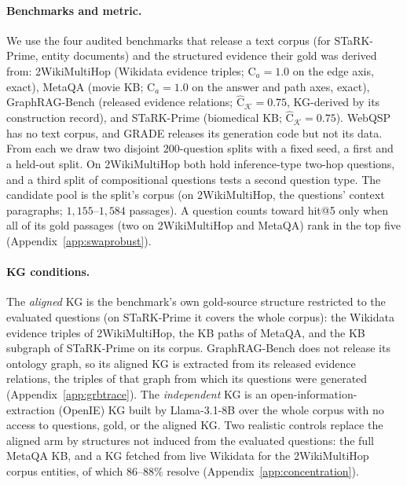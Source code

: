 \documentclass[11pt]{article}
\newcommand{\C}{\mathrm{C}}
\newcommand{\Chat}{\widehat{\mathrm{C}}}
\newcommand{\kg}{\mathcal{K}}
\begin{document}
\paragraph{Benchmarks and metric.} We use the four audited benchmarks that release a text corpus (for STaRK-Prime, entity documents) and the structured evidence their gold was derived from: 2WikiMultiHop (Wikidata evidence triples; $\C_a=1.0$ on the edge axis, exact), MetaQA (movie KB; $\C_a=1.0$ on the answer and path axes, exact), GraphRAG-Bench (released evidence relations; $\Chat_{\kg}=0.75$, KG-derived by its construction record), and STaRK-Prime (biomedical KB; $\Chat_{\kg}=0.75$). WebQSP has no text corpus, and GRADE releases its generation code but not its data. From each we draw two disjoint $200$-question splits with a fixed seed, a first and a held-out split. On 2WikiMultiHop both hold inference-type two-hop questions, and a third split of compositional questions tests a second question type. The candidate pool is the split's corpus (on 2WikiMultiHop, the questions' context paragraphs; $1{,}155$--$1{,}584$ passages). A question counts toward hit@5 only when all of its gold passages (two on 2WikiMultiHop and MetaQA) rank in the top five (Appendix~\ref{app:swaprobust}).

\paragraph{KG conditions.} The \emph{aligned} KG is the benchmark's own gold-source structure restricted to the evaluated questions (on STaRK-Prime it covers the whole corpus): the Wikidata evidence triples of 2WikiMultiHop, the KB paths of MetaQA, and the KB subgraph of STaRK-Prime on its corpus. GraphRAG-Bench does not release its ontology graph, so its aligned KG is extracted from its released evidence relations, the triples of that graph from which its questions were generated (Appendix~\ref{app:grbtrace}). The \emph{independent} KG is an open-information-extraction (OpenIE) KG built by Llama-3.1-8B over the whole corpus with no access to questions, gold, or the aligned KG. Two realistic controls replace the aligned arm by structures not induced from the evaluated questions: the full MetaQA KB, and a KG fetched from live Wikidata for the 2WikiMultiHop corpus entities, of which $86$--$88\%$ resolve (Appendix~\ref{app:concentration}).
\end{document}
